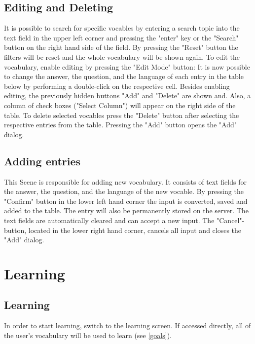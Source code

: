         \subsection{Editing and Deleting}
        It is possible to search for specific vocables by entering a search topic into the text field in the upper left corner and pressing the "enter" key or the "Search" button on the right hand side of the field. By pressing the "Reset" button the filters will be reset and the whole vocabulary will be shown again.
        To edit the vocabulary, enable editing by pressing the "Edit Mode" button:
        It is now possible to change the answer, the question, and the language of each entry in the table below by performing a double-click on the respective cell. Besides enabling editing, the previously hidden buttons "Add" and "Delete" are shown and. Also, a column of check boxes  ("Select Column") will appear on the right side of the table. To delete selected vocables  press the "Delete" button after selecting the respective entries from the table.  
        Pressing the "Add" button opens the "Add" dialog.
  
        \subsection{Adding entries} 
        This Scene is responsible for adding new vocabulary. It consists of text fields for the answer, the question, and the language of the new vocable. By pressing the "Confirm" button in the lower left hand corner the input is converted, saved and added to the table. The entry will also be permanently stored on the server. The text fields are automatically cleared and can accept a new input. The "Cancel"-button, located in the lower right hand corner, cancels all input and closes the "Add" dialog.
    
    \section{Learning}
        
        \subsection{Learning}
        In order to start learning, switch to the learning screen. If accessed directly, all of the user's vocabulary will be used to learn (see \cref{goals}). \\
        
